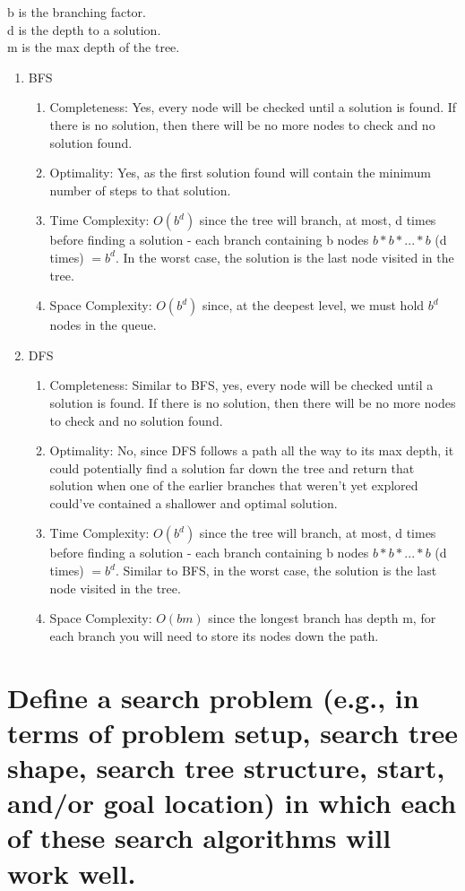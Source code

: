 \documentclass[11pt]{article}
\begin{document}
b is the branching factor.\\
d is the depth to a solution.\\
m is the max depth of the tree.
\begin{enumerate} 
	\item BFS
	\begin{enumerate}
		\item Completeness: Yes, every node will be checked until a solution is found. If there is no solution, then there will be no more nodes to check and no solution found.
		\item Optimality: Yes, as the first solution found will contain the minimum number of steps to that solution.
		\item Time Complexity: $ O(b^d) $ since the tree will branch, at most, d times before finding a solution - each branch containing b nodes $ b * b * ... * b $ (d times) $ = b^d$. In the worst case, the solution is the last node visited in the tree.
		\item Space Complexity: $ O(b^d) $ since, at the deepest level, we must hold $b^d$ nodes in the queue.
	\end{enumerate}
	\item DFS
	\begin{enumerate}
		\item Completeness: Similar to BFS, yes, every node will be checked until a solution is found. If there is no solution, then there will be no more nodes to check and no solution found.
		\item Optimality: No, since DFS follows a path all the way to its max depth, it could potentially find a solution far down the tree and return that solution when one of the earlier branches that weren't yet explored could've contained a shallower and optimal solution.
		\item Time Complexity: $ O(b^d) $ since the tree will branch, at most, d times before finding a solution - each branch containing b nodes $ b * b * ... * b $ (d times) $ = b^d$. Similar to BFS, in the worst case, the solution is the last node visited in the tree.
		\item Space Complexity: $ O(bm) $ since the longest branch has depth m, for each branch you will need to store its nodes down the path.
	\end{enumerate}
\end{enumerate}

\section{Define a search problem (e.g., in terms of problem setup, search tree shape, search tree structure, start, and/or goal location) in which each of these search algorithms will work well.}
\end{document}
